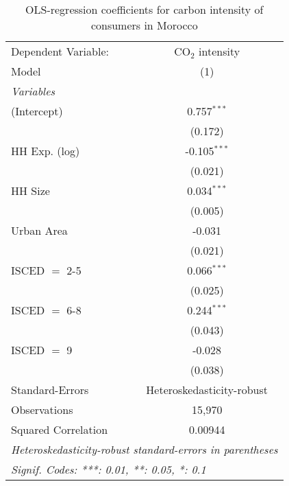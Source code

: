 
\begin{table}[htbp!]
   \centering
   \small
   \begin{adjustbox}{width = 1\textwidth, max height = 0.95\textheight, center}
      \begin{threeparttable}[b]
         \caption{\label{tab:OLS_1_MAR} OLS-regression coefficients for carbon intensity of consumers in Morocco}
         \begin{tabular}{lc}
            \tabularnewline \midrule \midrule
            Dependent Variable: & CO$_{2}$ intensity\\  
            Model               & (1)\\  
            \midrule
            \emph{Variables}\\
            (Intercept)         & 0.757$^{***}$\\   
                                & (0.172)\\   
            HH Exp. (log)       & -0.105$^{***}$\\   
                                & (0.021)\\   
            HH Size             & 0.034$^{***}$\\   
                                & (0.005)\\   
            Urban Area          & -0.031\\   
                                & (0.021)\\   
            ISCED $=$ 2-5       & 0.066$^{***}$\\   
                                & (0.025)\\   
            ISCED $=$ 6-8       & 0.244$^{***}$\\   
                                & (0.043)\\   
            ISCED $=$ 9         & -0.028\\   
                                & (0.038)\\   
            \midrule 
            Standard-Errors     & Heteroskedasticity-robust \\   
            Observations        & 15,970\\  
            Squared Correlation & 0.00944\\  
            \midrule \midrule
            \multicolumn{2}{l}{\emph{Heteroskedasticity-robust standard-errors in parentheses}}\\
            \multicolumn{2}{l}{\emph{Signif. Codes: ***: 0.01, **: 0.05, *: 0.1}}\\
         \end{tabular}
         

\end{threeparttable}
\end{adjustbox}
\end{table}
